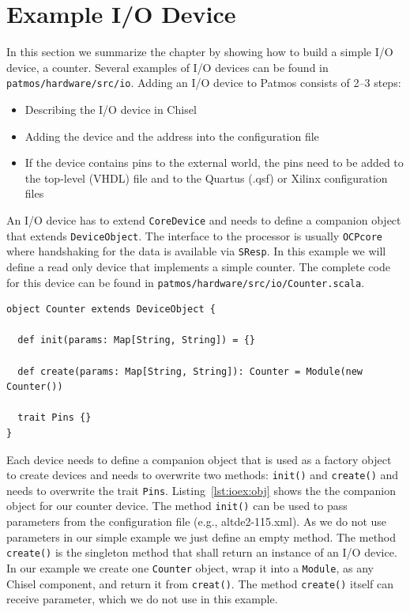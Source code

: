 \documentclass[a4paper,fontsize=10pt,twoside,DIV15,BCOR12mm,headinclude=true,footinclude=false,pagesize,bibtotoc]{scrbook}
\newcommand{\code}[1]{{\texttt{#1}}}
\begin{document}
\section{Example I/O Device}

In this section we summarize the chapter by showing how to build a simple
I/O device, a counter.
Several examples of I/O devices can be found in \code{patmos/hardware/src/io}.
Adding an I/O device to Patmos consists of 2--3 steps:

\begin{itemize}
\item Describing the I/O device in Chisel
\item Adding the device and the address into the configuration file
\item If the device contains pins to the external world, the pins need to be added to
the top-level (VHDL) file and to the Quartus (.qsf) or Xilinx configuration files
\end{itemize}


An I/O device has to extend \code{CoreDevice} and needs to define a
companion object that extends \code{DeviceObject}. The interface to the
processor is usually \code{OCPcore} where handshaking for the data
is available via \code{SResp}.
In this example we will define a read only device that implements a simple
counter. The complete code for this device can be found in
\code{patmos/hardware/src/io/Counter.scala}.

\begin{lstlisting}[float, caption={Companion object for the counter device\label{lst:ioex:obj}}]
object Counter extends DeviceObject {

  def init(params: Map[String, String]) = {}

  def create(params: Map[String, String]): Counter = Module(new Counter())

  trait Pins {}
}
\end{lstlisting}

Each device needs to define a companion object that is used as a factory
object to create devices and needs to overwrite two methods: \code{init()}
and \code{create()} and needs to overwrite the trait \code{Pins}.
Listing~\ref{lst:ioex:obj} shows the the companion object for our counter
device. The method \code{init()} can be used to pass parameters from the
configuration file (e.g., altde2-115.xml). As we do not use parameters in our
simple example we just define an empty method. The method \code{create()}
is the singleton method that shall return an instance of an I/O device.
In our example we create one \code{Counter} object, wrap it into a \code{Module},
as any Chisel component, and return it from \code{creat()}. The method
\code{create()} itself can receive parameter, which we do not use in this example.
\end{document}
